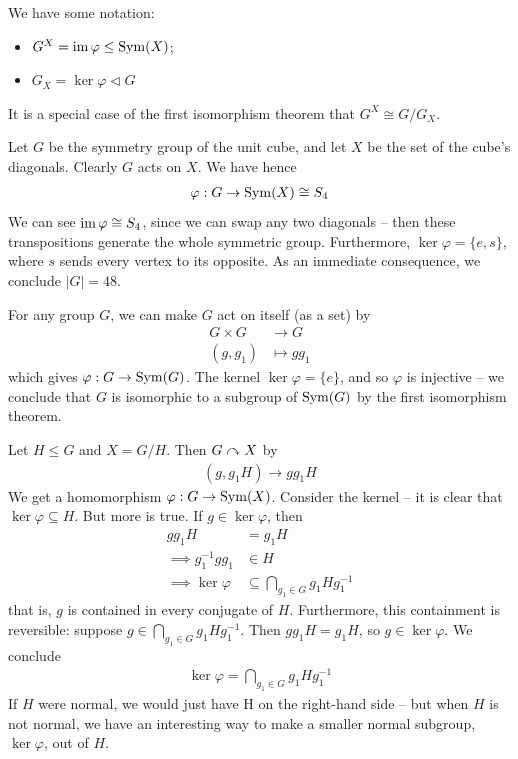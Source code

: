 \documentclass{../../template/note}
\begin{document}
    We have some notation:
    \begin{itemize}
        \item $G^X = \operatorname{im} \varphi \leq \operatorname{Sym}(X)$;
        \item $G_X = \ker \varphi \triangleleft G$
    \end{itemize}
    It is a special case of the first isomorphism theorem that $G^X \cong G/G_X$.
    
    \begin{example}
        Let $G$ be the symmetry group of the unit cube, and let $X$ be the set of the cube's diagonals. Clearly $G$ acts on $X$. We have hence
        \begin{align*}
            \varphi: G \to \operatorname{Sym}(X) \cong S_4
        \end{align*}
        We can see $\operatorname{im} \varphi \cong S_4$, since we can swap any two diagonals -- then these transpositions generate the whole symmetric group. Furthermore, $\ker \varphi = \{e, s\}$, where $s$ sends every vertex to its opposite. As an immediate consequence, we conclude $|G| = 48$.
    \end{example}
    
    \begin{example}
        For any group $G$, we can make $G$ act on itself (as a set) by
        \begin{align*}
            G \times G &\to G \\
            (g, g_1) &\mapsto gg_1
        \end{align*}
        which gives $\varphi: G \to \operatorname{Sym}(G)$. The kernel $\ker \varphi = \{e\}$, and so $\varphi$ is injective -- we conclude that $G$ is isomorphic to a subgroup of $\operatorname{Sym}(G)$ by the first isomorphism theorem.
    \end{example}
    
    \begin{example}
        Let $H \leq G$ and $X = G/H$. Then $G \curvearrowright X$ by
        \begin{align*}
            (g, g_1H) \to gg_1H
        \end{align*}
        We get a homomorphism $\varphi: G \to \operatorname{Sym}(X)$. Consider the kernel -- it is clear that $\ker \varphi \subseteq H$. But more is true. If $g \in \ker \varphi$, then
        \begin{align*}
            gg_1H &= g_1H \\
            \implies g_1^{-1}gg_1 &\in H \\
            \implies \ker \varphi &\subseteq \bigcap_{g_1 \in G}g_1Hg_1^{-1}
        \end{align*}
        that is, $g$ is contained in every conjugate of $H$. Furthermore, this containment is reversible: suppose $g \in \bigcap_{g_1 \in G} g_1Hg_1^{-1}$. Then $gg_1H = g_1H$, so $g \in \ker \varphi$. We conclude
        \begin{align*}
            \ker \varphi = \bigcap_{g_1 \in G} g_1Hg_1^{-1}
        \end{align*}
        If $H$ were normal, we would just have H on the right-hand side -- but when $H$ is not normal, we have an interesting way to make a smaller normal subgroup, $\ker \varphi$, out of $H$.
    \end{example}
    
\end{document}
